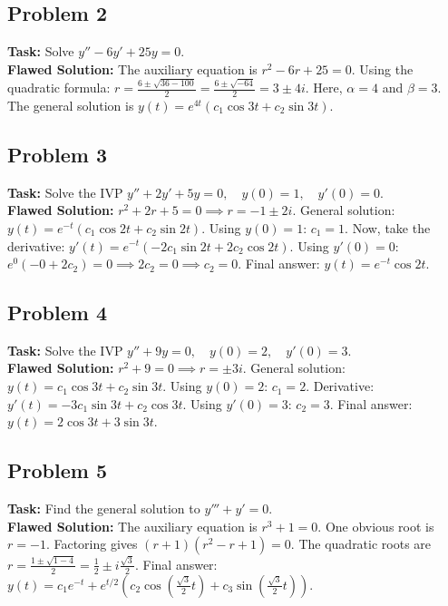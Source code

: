 \documentclass[11pt]{article}
\begin{document}
\subsection*{Problem 2}
\textbf{Task:} Solve $y'' - 6y' + 25y = 0$. \\
\textbf{Flawed Solution:} 
The auxiliary equation is $r^2 - 6r + 25 = 0$. 
Using the quadratic formula: $r = \frac{6 \pm \sqrt{36 - 100}}{2} = \frac{6 \pm \sqrt{-64}}{2} = 3 \pm 4i$. 
Here, $\alpha = 4$ and $\beta = 3$. 
The general solution is $y(t) = e^{4t}(c_1 \cos 3t + c_2 \sin 3t)$.

\subsection*{Problem 3}
\textbf{Task:} Solve the IVP $y'' + 2y' + 5y = 0, \quad y(0)=1, \quad y'(0)=0$. \\
\textbf{Flawed Solution:} 
$r^2 + 2r + 5 = 0 \implies r = -1 \pm 2i$. 
General solution: $y(t) = e^{-t}(c_1 \cos 2t + c_2 \sin 2t)$. 
Using $y(0)=1$: $c_1 = 1$. 
Now, take the derivative: $y'(t) = e^{-t}(-2c_1 \sin 2t + 2c_2 \cos 2t)$. 
Using $y'(0)=0$: $e^0(-0 + 2c_2) = 0 \implies 2c_2 = 0 \implies c_2 = 0$. 
Final answer: $y(t) = e^{-t} \cos 2t$.

\subsection*{Problem 4}
\textbf{Task:} Solve the IVP $y'' + 9y = 0, \quad y(0)=2, \quad y'(0)=3$. \\
\textbf{Flawed Solution:} 
$r^2 + 9 = 0 \implies r = \pm 3i$. 
General solution: $y(t) = c_1 \cos 3t + c_2 \sin 3t$. 
Using $y(0)=2$: $c_1 = 2$. 
Derivative: $y'(t) = -3c_1 \sin 3t + c_2 \cos 3t$. 
Using $y'(0)=3$: $c_2 = 3$. 
Final answer: $y(t) = 2 \cos 3t + 3 \sin 3t$.

\subsection*{Problem 5}
\textbf{Task:} Find the general solution to $y''' + y' = 0$. \\
\textbf{Flawed Solution:} 
The auxiliary equation is $r^3 + 1 = 0$. 
One obvious root is $r = -1$. 
Factoring gives $(r+1)(r^2 - r + 1) = 0$. 
The quadratic roots are $r = \frac{1 \pm \sqrt{1 - 4}}{2} = \frac{1}{2} \pm i\frac{\sqrt{3}}{2}$. 
Final answer: $y(t) = c_1 e^{-t} + e^{t/2}\left(c_2 \cos\left(\frac{\sqrt{3}}{2}t\right) + c_3 \sin\left(\frac{\sqrt{3}}{2}t\right)\right)$.
\end{document}
